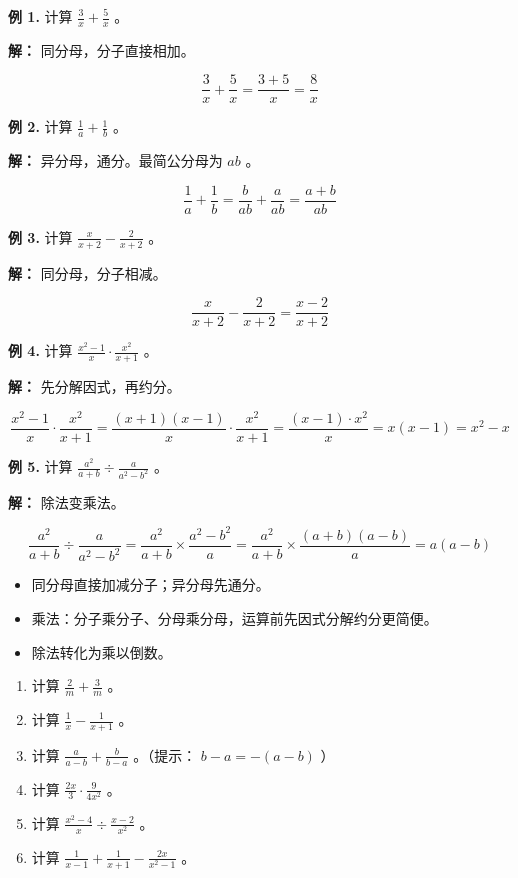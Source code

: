 \begin{workedexamples}


\textbf{例 1.} 计算 $\frac{3}{x} + \frac{5}{x}$ 。

\textbf{解：} 同分母，分子直接相加。

\[
\frac{3}{x} + \frac{5}{x} = \frac{3 + 5}{x} = \frac{8}{x}
\]


\textbf{例 2.} 计算 $\frac{1}{a} + \frac{1}{b}$ 。

\textbf{解：} 异分母，通分。最简公分母为 $ab$ 。

\[
\frac{1}{a} + \frac{1}{b} = \frac{b}{ab} + \frac{a}{ab} = \frac{a + b}{ab}
\]


\textbf{例 3.} 计算 $\frac{x}{x+2} - \frac{2}{x+2}$ 。

\textbf{解：} 同分母，分子相减。

\[
\frac{x}{x+2} - \frac{2}{x+2} = \frac{x - 2}{x + 2}
\]


\textbf{例 4.} 计算 $\frac{x^2 - 1}{x} \cdot \frac{x^2}{x + 1}$ 。

\textbf{解：} 先分解因式，再约分。

\[
\frac{x^2 - 1}{x} \cdot \frac{x^2}{x + 1} = \frac{(x+1)(x-1)}{x} \cdot \frac{x^2}{x+1} = \frac{(x-1) \cdot x^2}{x} = x(x - 1) = x^2 - x
\]


\textbf{例 5.} 计算 $\frac{a^2}{a+b} \div \frac{a}{a^2 - b^2}$ 。

\textbf{解：} 除法变乘法。

\[
\frac{a^2}{a+b} \div \frac{a}{a^2 - b^2} = \frac{a^2}{a+b} \times \frac{a^2 - b^2}{a} = \frac{a^2}{a+b} \times \frac{(a+b)(a-b)}{a} = a(a - b)
\]


\end{workedexamples}

\begin{keytakeaway}


\begin{itemize}
  \item 同分母直接加减分子；异分母先通分。
  \item 乘法：分子乘分子、分母乘分母，运算前先因式分解约分更简便。
  \item 除法转化为乘以倒数。
\end{itemize}


\end{keytakeaway}

\begin{practice}


\begin{enumerate}
  \item 计算 $\frac{2}{m} + \frac{3}{m}$ 。
  \item 计算 $\frac{1}{x} - \frac{1}{x+1}$ 。
  \item 计算 $\frac{a}{a-b} + \frac{b}{b-a}$ 。（提示： $b - a = -(a - b)$ ）
  \item 计算 $\frac{2x}{3} \cdot \frac{9}{4x^2}$ 。
  \item 计算 $\frac{x^2 - 4}{x} \div \frac{x - 2}{x^2}$ 。
  \item 计算 $\frac{1}{x-1} + \frac{1}{x+1} - \frac{2x}{x^2-1}$ 。
\end{enumerate}


\end{practice}

